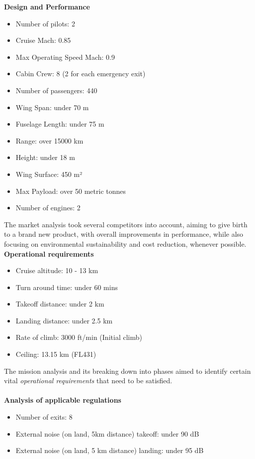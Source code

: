 \documentclass{article}
\begin{document}
\textbf{Design and Performance\label{Design_and_performance}}
\begin{itemize}
    \item Number of pilots: 2
    \item Cruise Mach: 0.85
    \item Max Operating Speed Mach: 0.9
    \item Cabin Crew: 8 (2 for each emergency exit)
    \item Number of passengers: 440
    \item Wing Span: under 70 m
    \item Fuselage Length: under 75 m
    \item Range: over 15000 km
    \item Height: under 18 m
    \item Wing Surface: 450 m²
    \item Max Payload: over 50 metric tonnes
    \item Number of engines: 2
\end{itemize}

The market analysis took several competitors into account, aiming to give birth to a brand new product, with overall improvements
in performance, while also focusing on environmental sustainability and cost reduction, whenever possible. \\ 
\clearpage 
\textbf{Operational requirements\label{Operational_requirements}}
\begin{itemize}
    \item Cruise altitude: 10 - 13 km
    \item Turn around time: under 60 mins
    \item Takeoff distance: under 2 km
    \item Landing distance: under 2.5 km
    \item Rate of climb: 3000 ft/min (Initial climb)
    \item Ceiling: 13.15 km (FL431)
\end{itemize}

The mission analysis and its breaking down into phases aimed to identify certain vital \textit{operational requirements} that need to be satisfied. \\ \\ 

\textbf{Analysis of applicable regulations\label{Analysis_applicable_regulations}}
\begin{itemize}
    \item Number of exits: 8
    \item External noise (on land, 5km distance) takeoff: under 90 dB
    \item External noise (on land, 5 km distance) landing: under 95 dB
\end{itemize}
\end{document}

